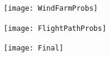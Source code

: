 \documentclass[11pt,letterpaper,openany]{report}
\begin{document}
\begin{figure}
   \centering
   \texttt{[image: WindFarmProbs]}
   \caption{}
   \label{fig.WindFarmProbs}
\end{figure}

\begin{figure}
   \centering
   \texttt{[image: FlightPathProbs]}
   \caption{}
   \label{fig.FlightPathProbs}
\end{figure}

\begin{figure}
   \centering
   \texttt{[image: Final]}
   \label{fig.Final}
   \caption{}
\end{figure}

%
%

\end{document}
